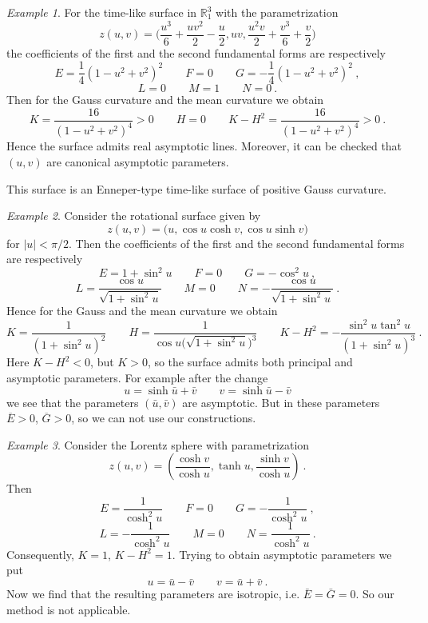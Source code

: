 \documentclass[12pt]{amsart}
\theoremstyle{definition}
\theoremstyle{remark}
\newtheorem{example}{Example}[section]
\begin{document}
\begin{example} \label{ex:1}  For the time-like surface in $\mathbb R^3_1$  with the parametrization
$$
	z(u,v)=\Big( \frac{u^3}6+\frac{uv^2}2-\frac u2,uv,\frac{u^2v}2+\frac{v^3}6+\frac v2 \Big)   
$$
the coefficients of the first and the second fundamental forms are respectively
$$
	E= \frac14(1-u^2+v^2)^2 \qquad F=0  \qquad G= - \frac14(1-u^2+v^2)^2 \ ,
$$
$$
	L=0  \qquad M=1  \qquad  N=0 \ .
$$
Then for the Gauss curvature and the mean curvature we obtain
$$
	K=\frac{16}{(1-u^2+v^2)^4}>0 \qquad  H=0   \qquad K-H^2=\frac{16}{(1-u^2+v^2)^4}>0  \ .
$$
Hence the surface admits real asymptotic lines. Moreover, it can be checked that  
$(u,v)$ are canonical asymptotic parameters. 

This surface is an Enneper-type time-like surface of positive Gauss curvature.

\end{example}

\begin{example} \label{ex:3}   Consider the rotational surface given by
$$
	z(u,v)=\Big( u,\cos u\cosh v,\cos  u\sinh v \Big) 
$$
for $|u|<\pi/2$. Then the coefficients of the first and the second fundamental forms are respectively
$$
	E=1+\sin^2u  \qquad F=0  \qquad G=-\cos^2u \ ,
$$
$$
	L=\frac{\cos u}{\sqrt{1+\sin^2u}}  \qquad M=0  \qquad  N=-\frac{\cos u}{\sqrt{1+\sin^2u}}  \ .
$$
Hence for the Gauss and the mean curvature we obtain
$$
	K=\frac{1}{(1+\sin^2 u)^2}   \qquad H=\frac1{\cos u\big(\sqrt{1+\sin^2u}\big)^3}  \qquad K-H^2=-\frac{\sin^2u\tan^2u}{(1+\sin^2u)^3} \ .
$$
Here $K-H^2<0$, but $K>0$, so the surface admits both principal and asymptotic parameters. For example after the
change 
$$
	u=\sinh\bar u+\bar v  \qquad  v=\sinh\bar u-\bar v
$$
we see that the parameters $(\bar u, \bar v)$ are asymptotic. But  in these parameters 
$\overline E>0$, $\overline G>0$, so we can not use our constructions.
\end{example}


\begin{example} \label{ex:4}  Consider  the Lorentz sphere with parametrization
$$
	z(u,v)=\left( \frac{\cosh v}{\cosh u},\tanh u,\frac{\sinh v}{\cosh u} \right)  \ .
$$
Then 
$$
	E=\frac1{\cosh^2u }   \qquad   F=0   \qquad   G=-\frac1{\cosh^2u }  \ ,
$$
$$
	L=-\frac1{\cosh^2u}    \qquad   M=0   \qquad  N=\frac1{\cosh^2u}  \ .
$$
Consequently, $K=1$, $K-H^2=1$. Trying to obtain asymptotic parameters we put
$$
	u=\bar u-\bar v    \qquad    v=\bar u +\bar v \ .
$$ 
Now we find that
the resulting parameters are isotropic, i.e. $\bar E=\bar G=0$. So our method is not applicable.

\end{example}
\end{document}
